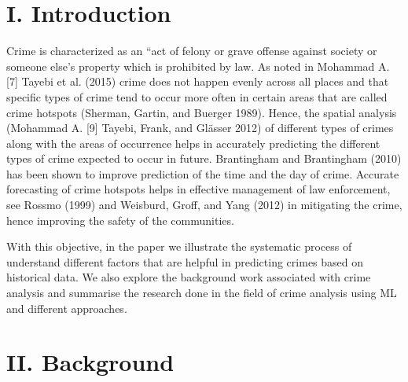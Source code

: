 \documentclass[conference,final,]{IEEEtran}
\begin{document}
\maketitle


%
\IEEEpeerreviewmaketitle


\section{I. Introduction}\label{i.-introduction}

Crime is characterized as an ``act of felony or grave offense against
society or someone else's property which is prohibited by law. As noted
in Mohammad A. {[}7{]} Tayebi et al. (2015) crime does not happen evenly
across all places and that specific types of crime tend to occur more
often in certain areas that are called crime hotspots (Sherman, Gartin,
and Buerger 1989). Hence, the spatial analysis (Mohammad A. {[}9{]}
Tayebi, Frank, and Glässer 2012) of different types of crimes along with
the areas of occurrence helps in accurately predicting the different
types of crime expected to occur in future. Brantingham and Brantingham
(2010) has been shown to improve prediction of the time and the day of
crime. Accurate forecasting of crime hotspots helps in effective
management of law enforcement, see Rossmo (1999) and Weisburd, Groff,
and Yang (2012) in mitigating the crime, hence improving the safety of
the communities.

With this objective, in the paper we illustrate the systematic process
of understand different factors that are helpful in predicting crimes
based on historical data. We also explore the background work associated
with crime analysis and summarise the research done in the field of
crime analysis using ML and different approaches.

\section{II. Background}\label{ii.-background}
\end{document}
